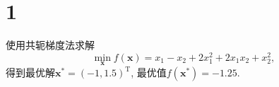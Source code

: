 \section*{1}

使用共轭梯度法求解
\begin{equation*}
    \min_{\bm{x}} f(\bm{x})=x_1-x_2+2x_1^2+2x_1x_2+x_2^2,
\end{equation*}
得到最优解$\bm{x}^*=(-1, 1.5)^\mathrm{T}$, 最优值$f(\bm{x}^*)=-1.25$.
